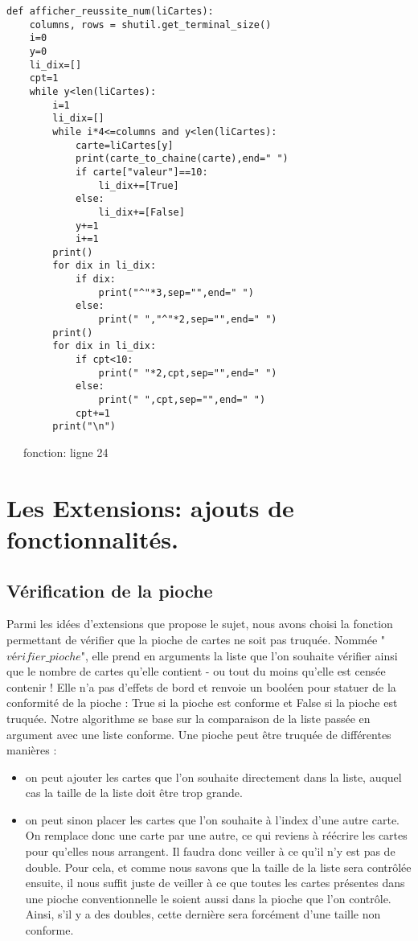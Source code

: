 \documentclass[10pt,a4paper,french,titlepage]{article}
\theoremstyle{definition}
\begin{document}
\begin{lstlisting}
def afficher_reussite_num(liCartes):
    columns, rows = shutil.get_terminal_size()
    i=0
    y=0
    li_dix=[]
    cpt=1
    while y<len(liCartes):
        i=1
        li_dix=[]
        while i*4<=columns and y<len(liCartes): 
            carte=liCartes[y]
            print(carte_to_chaine(carte),end=" ")
            if carte["valeur"]==10:
                li_dix+=[True]
            else:
                li_dix+=[False]
            y+=1
            i+=1
        print()
        for dix in li_dix:
            if dix:
                print("^"*3,sep="",end=" ")
            else:
                print(" ","^"*2,sep="",end=" ")
        print()
        for dix in li_dix:
            if cpt<10:
                print(" "*2,cpt,sep="",end=" ")
            else:
                print(" ",cpt,sep="",end=" ")
            cpt+=1
        print("\n")
\end{lstlisting}
~~~fonction: ligne 24



\section{Les Extensions: ajouts de fonctionnalités.}
\subsection{Vérification de la pioche}
Parmi les idées d'extensions que propose le sujet, nous avons choisi la fonction permettant de vérifier que la pioche de cartes ne soit pas truquée. Nommée "$vérifier\_pioche$", elle prend en arguments la liste que l'on souhaite vérifier ainsi que le nombre de cartes qu'elle contient - ou tout du moins qu'elle est censée contenir ! Elle n'a pas d'effets de bord et renvoie un booléen pour statuer de la conformité de la pioche : True si la pioche est conforme et False si la pioche est truquée. Notre algorithme se base sur la comparaison de la liste passée en argument avec une liste conforme. Une pioche peut être truquée de différentes manières :
\begin{itemize}
\item on peut ajouter les cartes que l'on souhaite directement dans la liste, auquel cas la taille de la liste doit être trop grande.
\item on peut sinon placer les cartes que l'on souhaite à l'index d'une autre carte. On remplace donc une carte par une autre, ce qui reviens à réécrire les cartes pour qu'elles nous arrangent. Il faudra donc veiller à ce qu'il n'y est pas de double. Pour cela, et comme nous savons que la taille de la liste sera contrôlée ensuite, il nous suffit juste de veiller à ce que toutes les cartes présentes dans une pioche conventionnelle le soient aussi dans la pioche que l'on contrôle. Ainsi, s'il y a des doubles, cette dernière sera forcément d'une taille non conforme.
\end{itemize}
\end{document}
